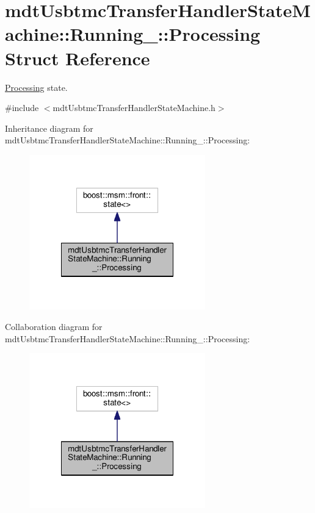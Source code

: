 \hypertarget{structmdt_usbtmc_transfer_handler_state_machine_1_1_running___1_1_processing}{\section{mdt\-Usbtmc\-Transfer\-Handler\-State\-Machine\-:\-:Running\-\_\-\-:\-:Processing Struct Reference}
\label{structmdt_usbtmc_transfer_handler_state_machine_1_1_running___1_1_processing}
}


\hyperlink{structmdt_usbtmc_transfer_handler_state_machine_1_1_running___1_1_processing}{Processing} state.  




{\ttfamily \#include $<$mdt\-Usbtmc\-Transfer\-Handler\-State\-Machine.\-h$>$}



Inheritance diagram for mdt\-Usbtmc\-Transfer\-Handler\-State\-Machine\-:\-:Running\-\_\-\-:\-:Processing\-:\nopagebreak
\begin{figure}[H]
\begin{center}
\leavevmode
\includegraphics[width=216pt]{structmdt_usbtmc_transfer_handler_state_machine_1_1_running___1_1_processing__inherit__graph}
\end{center}
\end{figure}


Collaboration diagram for mdt\-Usbtmc\-Transfer\-Handler\-State\-Machine\-:\-:Running\-\_\-\-:\-:Processing\-:\nopagebreak
\begin{figure}[H]
\begin{center}
\leavevmode
\includegraphics[width=216pt]{structmdt_usbtmc_transfer_handler_state_machine_1_1_running___1_1_processing__coll__graph}
\end{center}
\end{figure}

